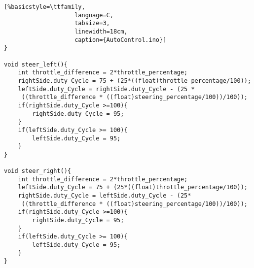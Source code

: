 \begin{lstlisting}[%basicstyle=\ttfamily,
					language=C,
					tabsize=3,
					linewidth=18cm,
					caption={AutoControl.ino}]
}

void steer_left(){
	int throttle_difference = 2*throttle_percentage;
	rightSide.duty_Cycle = 75 + (25*((float)throttle_percentage/100));
	leftSide.duty_Cycle = rightSide.duty_Cycle - (25 *
	 ((throttle_difference * ((float)steering_percentage/100))/100));
	if(rightSide.duty_Cycle >=100){
		rightSide.duty_Cycle = 95;
	}
	if(leftSide.duty_Cycle >= 100){
		leftSide.duty_Cycle = 95;
	}
}

void steer_right(){
	int throttle_difference = 2*throttle_percentage;
	leftSide.duty_Cycle = 75 + (25*((float)throttle_percentage/100));
	rightSide.duty_Cycle = leftSide.duty_Cycle - (25*
	 ((throttle_difference * ((float)steering_percentage/100))/100));
	if(rightSide.duty_Cycle >=100){
		rightSide.duty_Cycle = 95;
	}
	if(leftSide.duty_Cycle >= 100){
		leftSide.duty_Cycle = 95;
	}
}
\end{lstlisting}